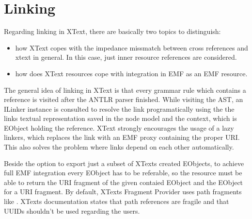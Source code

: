 \section{Linking}
Regarding linking in XText, there are basically two topics to distinguish: 
\begin{itemize}
	\item how XText copes with the impedance missmatch between cross references and xtext in general. In this case, just inner resource references are considered. 
	\item how does XText resources cope with integration in EMF as an EMF resource.
\end{itemize}
The general idea of linking in XText is that every grammar rule which contains a reference is visited after the ANTLR parser finished. While visiting the AST, an ILinker instance is consulted to resolve the link programatically using the the links textual representation saved in the node model and the context, which is EObject holding the reference. XText strongly encourages the usage of a lazy linkers, which replaces the link with an EMF proxy containing the proper URI. This also solves the problem where links depend on each other automatically.

Beside the option to export just a subset of XTexts created EObjects, to achieve full EMF integration every EObject has to be referable, so the resource must be able to return the URI fragment of the given contaied EObject and the EObject for a URI fragment. By default, XTexts Fragment Provider  uses path fragments like . XTexts documentation states that path references are fragile and that UUIDs shouldn't be used regarding the users. 

